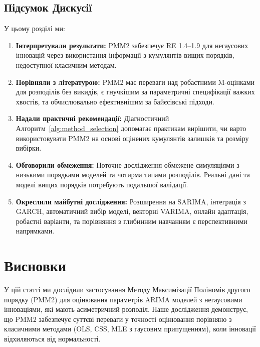 \documentclass[12pt,a4paper]{article}
\begin{document}
\subsection{Підсумок Дискусії}
\label{subsec:discussion_summary}

У цьому розділі ми:

\begin{enumerate}
    \item \textbf{Інтерпретували результати:} PMM2 забезпечує RE 1.4--1.9 для негаусових інновацій через використання інформації з кумулянтів вищих порядків, недоступної класичним методам.

    \item \textbf{Порівняли з літературою:} PMM2 має переваги над робастними M-оцінками для розподілів без викидів, є гнучкішим за параметричні специфікації важких хвостів, та обчислювально ефективнішим за байєсівські підходи.

    \item \textbf{Надали практичні рекомендації:} Діагностичний Алгоритм~\ref{alg:method_selection} допомагає практикам вирішити, чи варто використовувати PMM2 на основі оцінених кумулянтів залишків та розміру вибірки.

    \item \textbf{Обговорили обмеження:} Поточне дослідження обмежене симуляціями з низькими порядками моделей та чотирма типами розподілів. Реальні дані та моделі вищих порядків потребують подальшої валідації.

    \item \textbf{Окреслили майбутні дослідження:} Розширення на SARIMA, інтеграція з GARCH, автоматичний вибір моделі, векторні VARIMA, онлайн адаптація, робастні варіанти, та порівняння з глибинним навчанням є перспективними напрямками.
\end{enumerate}


\section{Висновки}
\label{sec:conclusion}

У цій статті ми дослідили застосування Методу Максимізації Поліномів другого порядку (PMM2) для оцінювання параметрів ARIMA моделей з негаусовими інноваціями, які мають асиметричний розподіл. Наше дослідження демонструє, що PMM2 забезпечує суттєві переваги у точності оцінювання порівняно з класичними методами (OLS, CSS, MLE з гаусовим припущенням), коли інновації відхиляються від нормальності.
\end{document}
